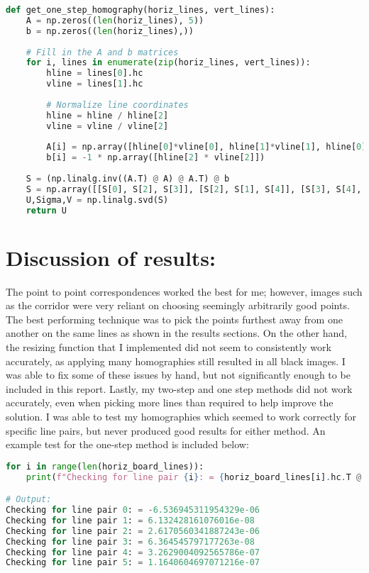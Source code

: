 \documentclass{article}
\begin{document}
\begin{lstlisting}[language=Python]
def get_one_step_homography(horiz_lines, vert_lines):
    A = np.zeros((len(horiz_lines), 5))
    b = np.zeros((len(horiz_lines),))
    
    # Fill in the A and b matrices
    for i, lines in enumerate(zip(horiz_lines, vert_lines)):
        hline = lines[0].hc
        vline = lines[1].hc
        
        # Normalize line coordinates
        hline = hline / hline[2]
        vline = vline / vline[2]
        
        A[i] = np.array([hline[0]*vline[0], hline[1]*vline[1], hline[0]*vline[1] + hline[1]*vline[0], hline[0]*vline[2] + hline[2]*vline[0], hline[1]*vline[2] + hline[2]*vline[1]])
        b[i] = -1 * np.array([hline[2] * vline[2]])
        
    S = (np.linalg.inv((A.T) @ A) @ A.T) @ b
    S = np.array([[S[0], S[2], S[3]], [S[2], S[1], S[4]], [S[3], S[4], 1]])
    U,Sigma,V = np.linalg.svd(S)
    return U
\end{lstlisting}

\section{Discussion of results:}
The point to point correspondences worked the best for me; however, images such as the corridor were very reliant on choosing seemingly arbitrarily good points. The best performing technique was to pick the points furthest away from one another on the same lines as shown in the results sections. On the other hand, the resizing function that I implemented did not seem to consistently work accurately, as applying many homographies still resulted in all black images. I was able to fix some of these issues by hand, but not significantly enough to be included in this report. Lastly, my two-step and one step methods did not work accurately, even when picking more lines than required to help improve the solution. I was able to test my homographies which seemed to work correctly for specific line pairs, but never produced good results for either method. An example test for the one-step method is included below:

\begin{lstlisting}[language=Python]
for i in range(len(horiz_board_lines)):
    print(f"Checking for line pair {i}: = {horiz_board_lines[i].hc.T @ H_onestep_board @ np.array([[1,0,0],[0,1,0],[0,0,0]]) @ H_onestep_board.T @ vert_board_lines[i].hc}")

# Output:
Checking for line pair 0: = -6.536945311954329e-06
Checking for line pair 1: = 6.132428161076016e-08
Checking for line pair 2: = 2.6170560341887243e-06
Checking for line pair 3: = 6.364545797177263e-08
Checking for line pair 4: = 3.2629004092565786e-07
Checking for line pair 5: = 1.1640604697071216e-07
\end{lstlisting}
\end{document}
